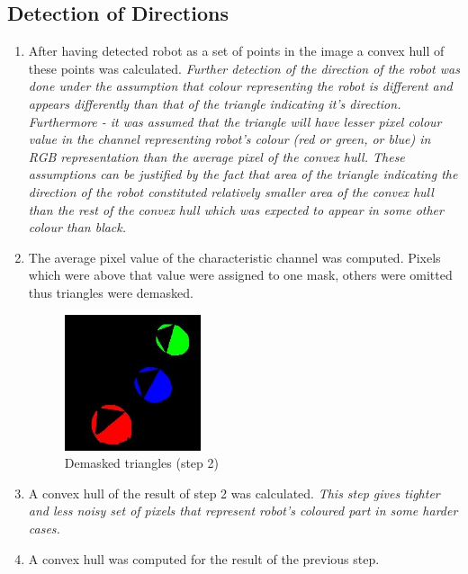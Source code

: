 \documentclass[10pt,a4paper]{article}
\begin{document}
\subsection{Detection of Directions}
\begin{enumerate}
    \item
    After having detected robot as a set of points in the image a convex hull 
    of these points was calculated.
    \textit{
    Further detection of the direction of the robot was done under the 
    assumption that colour representing the robot is different and appears 
    differently than that of the triangle indicating it's direction. 
    Furthermore - it was assumed that the triangle will have lesser pixel 
    colour value in the channel representing robot's colour (red or green, or 
    blue) in RGB representation than the average pixel of the convex hull. 
    These assumptions can be justified by the fact that area of the triangle 
    indicating the direction of the robot constituted relatively smaller area 
    of the convex hull than the rest of the convex hull which was expected to 
    appear in some other colour than black.
    } 

    \item
    The average pixel value of the characteristic channel was computed. Pixels 
    which were above that value were assigned to one mask, others were omitted 
    thus triangles were demasked.
    \begin{figure}[h]
        \centering
        \includegraphics[width=40mm]{d1_i5_demasked_triangles.jpg}
        \caption{Demasked triangles (step 2)}
    \end{figure} 

    \item
    A convex hull of the result of step 2 was calculated.
    \textit{
    This step gives tighter and less noisy set of pixels that represent robot's
    coloured part in some harder cases.
    }

    \item
    A convex hull was computed for the result of the previous step. 


\end{enumerate}
\end{document}
